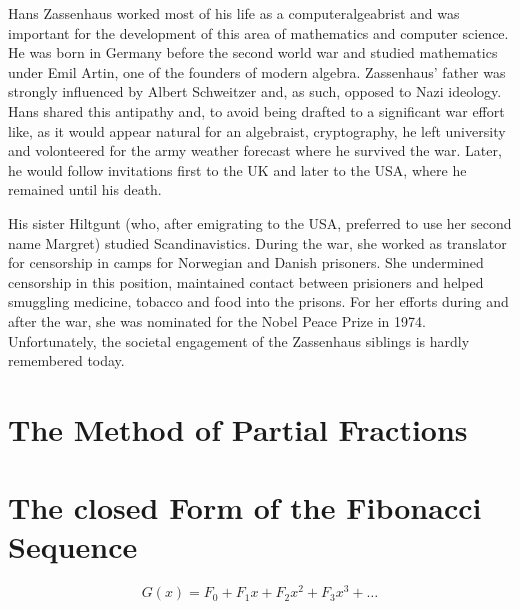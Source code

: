 \documentclass[tikz]{scrreprt}
\newcommand{\Conid}[1]{\mathit{#1}}
\def\resethooks{%
  \global\let\SaveRestoreHook\empty
  \global\let\ColumnHook\empty}
\let\hspre\empty
\let\hspost\empty
\begin{document}
Hans Zassenhaus worked most of his life as a computeralgeabrist and
was important for the development of this area of mathematics and
computer science. He was born in Germany before the second world war
and studied mathematics under Emil Artin, one of the founders of
modern algebra. Zassenhaus' father was strongly influenced by
Albert Schweitzer and, as such, opposed to Nazi ideology.
Hans shared this antipathy and, to avoid being drafted to
a significant war effort like, as it would appear natural
for an algebraist, cryptography, he left university and volonteered for 
the army weather forecast where he survived the war.
Later, he would follow invitations first to the UK and later to the USA,
where he remained until his death.

His sister Hiltgunt (who, after emigrating to the USA,
preferred to use her second name Margret) studied Scandinavistics.
During the war, she worked as translator for censorship in camps
for Norwegian and Danish prisoners. She undermined censorship in
this position, maintained contact between 
prisioners and helped smuggling medicine, tobacco and food
into the prisons. For her efforts during and after the war,
she was nominated for the Nobel Peace Prize in 1974. 
Unfortunately, the societal engagement of the Zassenhaus siblings
is hardly remembered today.


\section{The Method of Partial Fractions}
\section{The closed Form of the Fibonacci Sequence}
\ignore{
\begingroup\par\noindent\advance\leftskip\mathindent\(
\begin{pboxed}\SaveRestoreHook
\column{B}{@{}>{\hspre}l<{\hspost}@{}}%
\column{E}{@{}>{\hspre}l<{\hspost}@{}}%
\>[B]{}\mathbf{module}\;\Conid{ClosedFib}{}\<[E]%
\\
\>[B]{}\mathbf{where}{}\<[E]%
\ColumnHook
\end{pboxed}
\)\par\noindent\endgroup\resethooks
}

\begin{equation}
G(x) = F_0 + F_1x + F_2x^2 + F_3x^3 + \dots
\end{equation}
\end{document}

